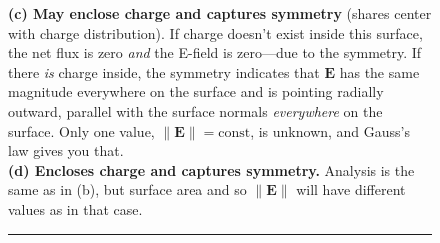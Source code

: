 \documentclass[10pt,letterpaper,twoside]{article}
\begin{document}
\begin{figure}[htb]
{	\textbf{(c) May enclose charge and captures symmetry} (shares center with charge distribution).
	If charge doesn't exist inside this surface, the net flux is zero \textit{and} the E-field is zero---due to the symmetry.
	If there \textit{is} charge inside, the symmetry indicates that $\bm E$ has the same magnitude everywhere on the surface and is pointing radially outward, parallel with the surface normals \textit{everywhere} on the surface.
	Only one value, $\|\bm E\|=\mathrm{const}$, is unknown, and Gauss's law gives you that.\\
	\textbf{(d) Encloses charge and captures symmetry.}
	Analysis is the same as in (b), but surface area and so $\|\bm E\|$ will have different values as in that case.}
    \label{fig:spherical_gaussian_surfaces}
  \hrule%
\vspace{10pt}
\end{figure}


%
\end{document}
